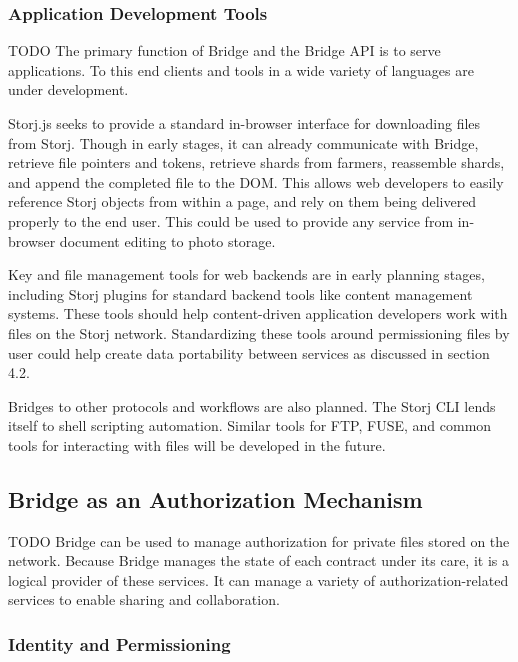 \documentclass[a4paper,10pt]{article}
\newcommand{\todo}[1]{{\color{red} TODO #1}}
\begin{document}
\subsubsection{Application Development Tools}

\todo{
The primary function of Bridge and the Bridge API is to serve applications. To
this end clients and tools in a wide variety of languages are under development.

Storj.js\cite{28} seeks to provide a standard in-browser interface for
downloading files from Storj. Though in early stages, it can already communicate
with Bridge, retrieve file pointers and tokens, retrieve shards from farmers,
reassemble shards, and append the completed file to the DOM. This allows web
developers to easily reference Storj objects from within a page, and rely on
them being delivered properly to the end user. This could be used to provide any
service from in-browser document editing to photo storage.

Key and file management tools for web backends are in early planning stages,
including Storj plugins for standard backend tools like content management
systems. These tools should help content-driven application developers work with
files on the Storj network. Standardizing these tools around permissioning files
by user could help create data portability between services as discussed in
section 4.2.

Bridges to other protocols and workflows are also planned. The Storj CLI lends
itself to shell scripting automation. Similar tools for FTP, FUSE, and common
tools for interacting with files will be developed in the future.
}

\subsection{Bridge as an Authorization Mechanism}

\todo{
Bridge can be used to manage authorization for private files stored on the
network. Because Bridge manages the state of each contract under its care, it is
a logical provider of these services. It can manage a variety of
authorization-related services to enable sharing and collaboration.
}

\subsubsection{Identity and Permissioning}
\end{document}
